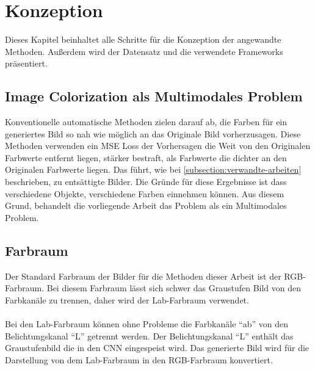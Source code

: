 \chapter{Konzeption}
Dieses Kapitel beinhaltet alle Schritte für die Konzeption der angewandte Methoden. Außerdem wird der Datensatz und die verwendete Frameworks 
präsentiert.

\section{Image Colorization als Multimodales Problem}
Konventionelle automatische Methoden zielen darauf ab, die Farben für ein generiertes Bild so nah wie möglich an das Originale Bild vorherzusagen.
Diese Methoden verwenden ein MSE Loss der Vorhersagen die Weit von den Originalen Farbwerte entfernt liegen, stärker bestraft, als Farbwerte
die dichter an den Originalen Farbwerte liegen. Das führt, wie bei \ref{subsection:verwandte-arbeiten} beschrieben, zu entsättigte Bilder.
Die Gründe für diese Ergebnisse ist dass verschiedene Objekte, verschiedene Farben einnehmen können. Aus diesem Grund, behandelt die vorliegende
Arbeit das Problem als ein Multimodales Problem.

\section{Farbraum}
Der Standard Farbraum der Bilder für die Methoden dieser Arbeit ist der RGB-Farbraum. Bei diesem Farbraum lässt sich schwer das Graustufen Bild 
von den Farbkanäle zu trennen, daher wird der Lab-Farbraum verwendet.
\\
\\
Bei den Lab-Farbraum können ohne Probleme die Farbkanäle ``ab'' von den Belichtungskanal ``L'' getrennt werden. Der Belichtungskanal ``L'' 
enthält das Graustufenbild die in den CNN eingespeist wird. Das generierte Bild wird für die Darstellung von dem Lab-Farbraum in den RGB-Farbraum 
konvertiert.

